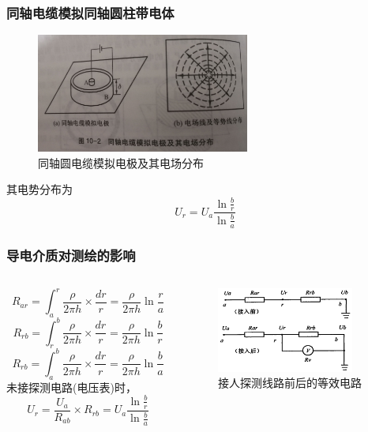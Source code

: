 \documentclass{beamer}
\begin{document}
    \begin{frame}
        \frametitle{同轴电缆模拟同轴圆柱带电体}
        \begin{figure}
            \centering
            \includegraphics[width=7cm]{同轴电缆}
            \caption{同轴圆电缆模拟电极及其电场分布}
        \end{figure}
        其电势分布为$$ U_r = U_a \frac{\ln \frac{b}{r}}{ \ln \frac{b}{a}{} } $$
        
    
    \end{frame}

    \begin{frame}
        \frametitle{导电介质对测绘的影响}
        
        \begin{columns}
            \begin{column}{.5\linewidth}
                
        $$ R_{ar} = \int_{a}^{r} \frac{\rho}{2 \pi h} \times \frac{dr}{r} = \frac{\rho}{2 \pi h} \ln \frac{r}{a}$$
        $$ R_{rb} = \int_{r}^{b} \frac{\rho}{2 \pi h} \times \frac{dr}{r} = \frac{\rho}{2 \pi h} \ln \frac{b}{r}$$
        $$ R_{rb} = \int_{a}^{b} \frac{\rho}{2 \pi h} \times \frac{dr}{r} = \frac{\rho}{2 \pi h} \ln \frac{b}{a}$$
        未接探测电路(电压表)时，$$U_r = \frac{U_a}{R_{ab}} \times R_{rb} = U_a \frac{\ln \frac{b}{r}}{\ln \frac ba}$$
        
        \end{column}
            \begin{column}{.5\linewidth}
                \begin{figure}[h]
                    \centering
                    \includegraphics[width=4.5cm]{接入探测电路前后的等效电路}
                    \caption{接人探测线路前后的等效电路}
                \end{figure}
            \end{column}

        \end{columns}

        
    \end{frame}
\end{document}
